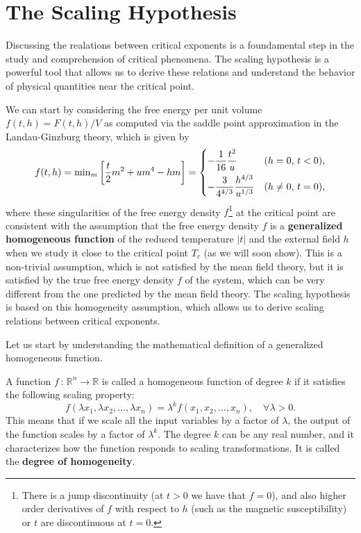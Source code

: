 \section{The Scaling Hypothesis}

Discussing the realations between critical exponents is a foundamental step in the study and comprehension of critical phenomena. The scaling hypothesis is a powerful tool that allows us to derive these relations and understand the behavior of physical quantities near the critical point.

We can start by considering the free energy per unit volume \(f(t,h) = F(t,h)/V\) as computed via the saddle point approximation in the Landau-Ginzburg theory, which is given by
\[
    f(t,h) = \text{min}_m \left[ \frac{t}{2}m^2 + u m^4 - h m \right] = \begin{dcases}
        - \frac{1}{16} \frac{t^2}{u}               & (h=0,\,t < 0),      \\
        -\frac{3}{4^{4/3}} \frac{h^{4/3}}{u^{1/3}} & (h \neq 0,\,t = 0), \\
    \end{dcases}
\]
where these singularities of the free energy density \(f\)\footnote{There is a jump discontinuity (at \(t>0\) we have that \(f=0\)), and also higher order derivatives of \(f\) with respect to \(h\) (such as the magnetic susceptibility) or \(t\) are discontinuous at \(t=0\).} at the critical point are consistent with the assumption that the free energy density \(f\) is a \textbf{generalized homogeneous function} of the reduced temperature \(\vert t \vert\) and the external field \(h\) when we study it close to the critical point \(T_c\) (as we will soon show). This is a non-trivial assumption, which is not satisfied by the mean field theory, but it is satisfied by the true free energy density \(f\) of the system, which can be very different from the one predicted by the mean field theory. The scaling hypothesis is based on this homogeneity assumption, which allows us to derive scaling relations between critical exponents.

Let us start by understanding the mathematical definition of a generalized homogeneous function.

\begin{definition}
    A function \(f\,:\,\mathbb{R}^n \to \mathbb{R}\) is called a homogeneous function of degree \(k\) if it satisfies the following scaling property:
    \[
        f(\lambda x_1, \lambda x_2, \dots, \lambda x_n) = \lambda^k f(x_1, x_2, \dots, x_n), \quad \forall \lambda > 0.
    \]
    This means that if we scale all the input variables by a factor of \(\lambda\), the output of the function scales by a factor of \(\lambda^k\). The degree \(k\) can be any real number, and it characterizes how the function responds to scaling transformations. It is called the \textbf{degree of homogeneity}.
\end{definition}

